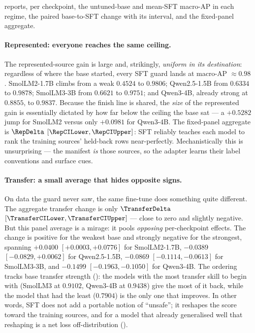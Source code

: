  reports, per checkpoint, the untuned-base and mean-SFT macro-AP in each regime, the
paired base-to-SFT change with its interval, and the fixed-panel aggregate.

\begin{table}[htbp]\centering\small
\caption{Act I --- fixed-panel result: base and mean-SFT macro-AP by regime, paired base-to-SFT deltas
with two-sided $95\%$ hierarchical-bootstrap intervals, and the fixed-panel aggregate. Descriptive under
the locked precision-focused mode; conditional on this panel.}
\label{tab:primary}
\resizebox{\textwidth}{!}{}
\end{table}

\paragraph{Represented: everyone reaches the same ceiling.} The represented-source gain is large and,
strikingly, \emph{uniform in its destination}: regardless of where the base started, every SFT guard
lands at macro-AP $\approx 0.98$. SmolLM2-1.7B climbs from a weak $0.4524$ to $0.9806$; Qwen2.5-1.5B
from $0.6334$ to $0.9878$; SmolLM3-3B from $0.6621$ to $0.9751$; and Qwen3-4B, already strong at
$0.8855$, to $0.9837$. Because the finish line is shared, the \emph{size} of the represented gain is
essentially dictated by how far below the ceiling the base sat --- a $+0.5282$ jump for SmolLM2 versus
only $+0.0981$ for Qwen3-4B. The fixed-panel aggregate is $\RepDelta$
$[\RepCILower, \RepCIUpper]$: SFT reliably teaches each model to rank the training sources' held-back
rows near-perfectly. Mechanistically this is unsurprising --- the manifest \emph{is} those sources, so
the adapter learns their label conventions and surface cues.

\paragraph{Transfer: a small average that hides opposite signs.} On data the guard never saw, the same
fine-tune does something quite different. The aggregate transfer change is only $\TransferDelta$
$[\TransferCILower, \TransferCIUpper]$ --- close to zero and slightly negative. But this panel average
is a mirage: it pools \emph{opposing} per-checkpoint effects. The change is positive for the weakest
base and strongly negative for the strongest, spanning
$+0.0400$ $[+0.0003, +0.0776]$ for SmolLM2-1.7B, $-0.0389$ $[-0.0829, +0.0062]$ for Qwen2.5-1.5B,
$-0.0869$ $[-0.1114, -0.0613]$ for SmolLM3-3B, and $-0.1499$ $[-0.1963, -0.1050]$ for Qwen3-4B. The
ordering tracks base transfer strength (): the models with the most transfer skill to
begin with (SmolLM3 at $0.9102$, Qwen3-4B at $0.9438$) give the most of it back, while the model that
had the least ($0.7904$) is the only one that improves. In other words, SFT does not add a portable
notion of ``unsafe''; it reshapes the score toward the training sources, and for a model that already
generalised well that reshaping is a net loss off-distribution ().

